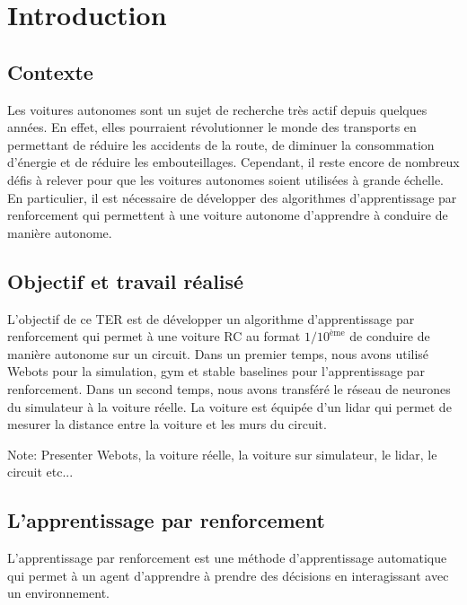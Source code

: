 \documentclass[french]{article}
\begin{document}
\newpage

\tableofcontents

\newpage

\section{Introduction}

\subsection{Contexte}

Les voitures autonomes sont un sujet de recherche très actif depuis quelques années. 
En effet, elles pourraient révolutionner le monde des transports en permettant de réduire les accidents de la route, 
de diminuer la consommation d'énergie et de réduire les embouteillages. 
Cependant, il reste encore de nombreux défis à relever pour que les voitures autonomes soient utilisées à grande échelle.
En particulier, il est nécessaire de développer des algorithmes d'apprentissage par renforcement qui permettent à une 
voiture autonome d'apprendre à conduire de manière autonome.

\subsection{Objectif et travail réalisé}
L'objectif de ce TER est de développer un algorithme d'apprentissage par renforcement qui permet à une 
voiture RC au format $1/10^{\text{ème}}$ de conduire de manière autonome sur un circuit. Dans un premier temps, nous 
avons utilisé Webots pour la simulation, gym et stable baselines pour l'apprentissage par renforcement.
Dans un second temps, nous avons transféré le réseau de neurones du simulateur à la voiture réelle.
La voiture est équipée d'un lidar qui permet de mesurer la distance entre la voiture et les murs du circuit.

\vspace{0.5cm}
\noindent
Note: Presenter Webots, la voiture réelle, la voiture sur simulateur, le lidar, le circuit etc...


\subsection{L'apprentissage par renforcement}
L'apprentissage par renforcement est une méthode d'apprentissage automatique qui permet à un agent 
d'apprendre à prendre des décisions en interagissant avec un environnement. 
\end{document}
